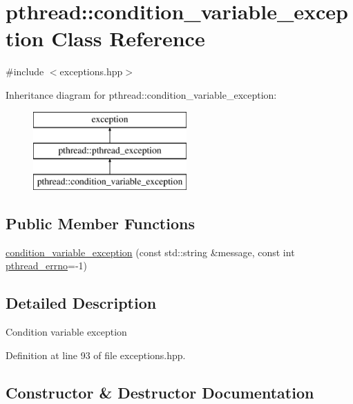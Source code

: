 \hypertarget{classpthread_1_1condition__variable__exception}{}\section{pthread\+:\+:condition\+\_\+variable\+\_\+exception Class Reference}
\label{classpthread_1_1condition__variable__exception}


{\ttfamily \#include $<$exceptions.\+hpp$>$}

Inheritance diagram for pthread\+:\+:condition\+\_\+variable\+\_\+exception\+:\begin{figure}[H]
\begin{center}
\leavevmode
\includegraphics[height=3.000000cm]{classpthread_1_1condition__variable__exception}
\end{center}
\end{figure}
\subsection*{Public Member Functions}
\begin{DoxyCompactItemize}
\item 
\hyperlink{classpthread_1_1condition__variable__exception_a5405694c69de500c7c6fdaba3e3af8a5}{condition\+\_\+variable\+\_\+exception} (const std\+::string \&message, const int \hyperlink{classpthread_1_1pthread__exception_a4a869173054faca1945ac1a7729082d6}{pthread\+\_\+errno}=-\/1)
\end{DoxyCompactItemize}


\subsection{Detailed Description}
Condition variable exception 

Definition at line 93 of file exceptions.\+hpp.



\subsection{Constructor \& Destructor Documentation}
